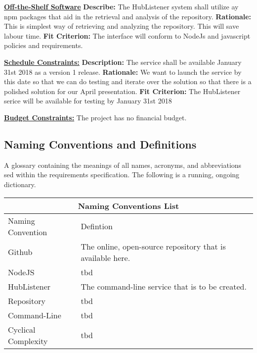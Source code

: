 \documentclass{article}
\begin{document}
\noindent
\textbf{\underline{Off-the-Shelf Software}}\newline
\textbf{Describe:}  The HubListener system shall utilize ay npm packages that aid in the retrieval and analysis of the repository. \newline
\textbf{Rationale:}  This is simplest way of retrieving and analyzing the repository. This will save labour time.\newline
\textbf{Fit Criterion:}  The interface will conform to NodeJs and javascript policies and requirements. \newline

\noindent
\textbf{\underline{Schedule Constraints:}}\newline
\textbf{Description:} The service shall be available January 31st 2018 as a version 1 release.\newline
\textbf{Rationale:} We want to launch the service by this date so that we can do testing and iterate over the solution so that there is a polished solution for our April presentation.\newline
\textbf{Fit Criterion:} The HubListener serice will be available for testing by January 31st 2018 \newline

\noindent
\textbf{\underline{Budget Constraints:}} 
The project has no financial budget. 

\subsection{Naming Conventions and Definitions}

A glossary containing the meanings of all names, acronyms, and abbreviations sed within the requirements specification. The following is a running, ongoing dictionary. 
\newline
\begin{tabular}{ |p{6cm}||p{6cm}|  }
 \hline
 \multicolumn{2}{|c|}{Naming Conventions List} \\
 \hline
 Naming        Convention & Defintion\\
 \hline 
Github & The online, open-source repository that is available here. \\
\hline
NodeJS & tbd \\
\hline
HubListener & The command-line service that is to be created.\\
\hline
Repository & tbd\\
\hline
Command-Line & tbd\\
\hline
Cyclical Complexity & tbd\\
\hline 
\end{tabular}
\end{document}

